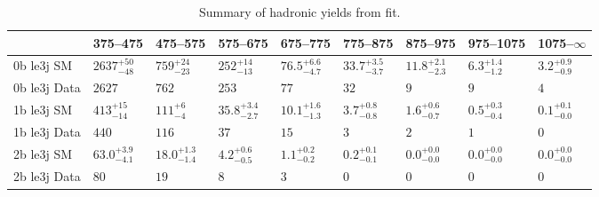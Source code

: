 \begin{center}
\begin{table}[h!]
  \caption{Summary of hadronic yields from fit.}
  \label{tab:ensemble-summary-posteriori}
  \centering
  \scriptsize
\begin{tabular}{ lllllllll }

\hline
& 375--475                       & 475--575                       & 575--675                       & 675--775                       & 775--875                       & 875--975                       & 975--1075                      & 1075--$\infty$                 \\ [1.000000ex]
\hline
0b le3j SM \T   & $2637^{+50}_{-48}$             & $759^{+24}_{-23}$              & $252^{+14}_{-13}$              & $76.5^{+6.6}_{-4.7}$           & $33.7^{+3.5}_{-3.7}$           & $11.8^{+2.1}_{-2.3}$           & $6.3^{+1.4}_{-1.2}$            & $3.2^{+0.9}_{-0.9}$            \\ 
0b le3j Data \T & $2627$                         & $762$                          & $253$                          & $77$                           & $32$                           & $9$                            & $9$                            & $4$                            \\ 
\hline
1b le3j SM \T   & $413^{+15}_{-14}$              & $111^{+6}_{-4}$                & $35.8^{+3.4}_{-2.7}$           & $10.1^{+1.6}_{-1.3}$           & $3.7^{+0.8}_{-0.8}$            & $1.6^{+0.6}_{-0.7}$            & $0.5^{+0.3}_{-0.4}$            & $0.1^{+0.1}_{-0.0}$            \\ 
1b le3j Data \T & $440$                          & $116$                          & $37$                           & $15$                           & $3$                            & $2$                            & $1$                            & $0$                            \\ 
\hline
2b le3j SM \T   & $63.0^{+3.9}_{-4.1}$           & $18.0^{+1.3}_{-1.4}$           & $4.2^{+0.6}_{-0.5}$            & $1.1^{+0.2}_{-0.2}$            & $0.2^{+0.1}_{-0.1}$            & $0.0^{+0.0}_{-0.0}$            & $0.0^{+0.0}_{-0.0}$            & $0.0^{+0.0}_{-0.0}$            \\ 
2b le3j Data \T & $80$                           & $19$                           & $8$                            & $3$                            & $0$                            & $0$                            & $0$                            & $0$                            \\ 

\end{tabular}
\end{table}
\end{center}
